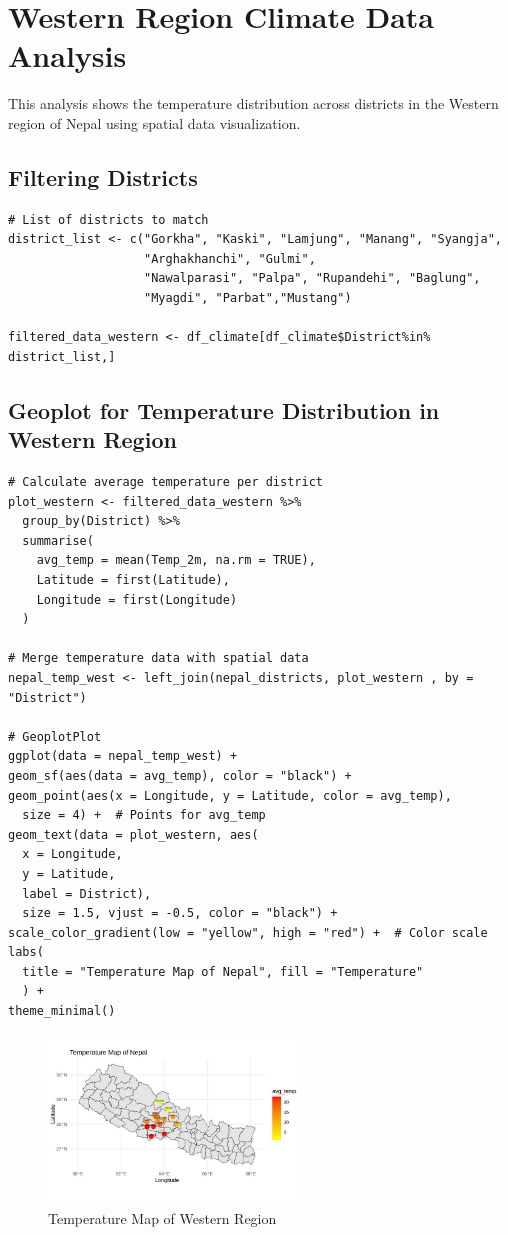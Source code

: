 \section{Western Region Climate Data Analysis}

This analysis shows the temperature distribution across districts in the Western region of Nepal using spatial data visualization.

\subsection*{Filtering Districts}

\begin{verbatim}
# List of districts to match
district_list <- c("Gorkha", "Kaski", "Lamjung", "Manang", "Syangja",
                   "Arghakhanchi", "Gulmi",
                   "Nawalparasi", "Palpa", "Rupandehi", "Baglung",
                   "Myagdi", "Parbat","Mustang")

filtered_data_western <- df_climate[df_climate$District%in% district_list,]
\end{verbatim}

\subsection*{Geoplot for Temperature Distribution in Western Region}

\begin{verbatim}
# Calculate average temperature per district
plot_western <- filtered_data_western %>%
  group_by(District) %>%
  summarise(
    avg_temp = mean(Temp_2m, na.rm = TRUE),
    Latitude = first(Latitude),
    Longitude = first(Longitude)
  )

# Merge temperature data with spatial data
nepal_temp_west <- left_join(nepal_districts, plot_western , by = "District")

# GeoplotPlot
ggplot(data = nepal_temp_west) +
geom_sf(aes(data = avg_temp), color = "black") +
geom_point(aes(x = Longitude, y = Latitude, color = avg_temp), 
  size = 4) +  # Points for avg_temp
geom_text(data = plot_western, aes(
  x = Longitude, 
  y = Latitude, 
  label = District),
  size = 1.5, vjust = -0.5, color = "black") +
scale_color_gradient(low = "yellow", high = "red") +  # Color scale
labs(
  title = "Temperature Map of Nepal", fill = "Temperature"
  ) +
theme_minimal()
\end{verbatim}

\begin{figure}[h]
    \centering
    \includegraphics[width=0.6\textwidth]{figures/map_west.jpg}
    \caption{Temperature Map of Western Region}
\end{figure}

